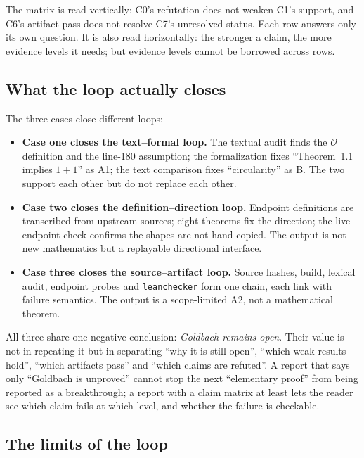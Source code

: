 \documentclass[11pt,a4paper]{article}
\theoremstyle{plain}
\theoremstyle{definition}
\begin{document}
The matrix is read vertically: C0's refutation does not weaken C1's support, and C6's artifact pass does not resolve C7's unresolved status. Each row answers only its own question. It is also read horizontally: the stronger a claim, the more evidence levels it needs; but evidence levels cannot be borrowed across rows.

\subsection{What the loop actually closes}
\label{sec:what-closed}

The three cases close different loops:

\begin{itemize}
\item \textbf{Case one closes the text--formal loop.} The textual audit finds the $\mathcal O$ definition and the line-180 assumption; the formalization fixes ``Theorem~1.1 implies $1+1$'' as A1; the text comparison fixes ``circularity'' as B. The two support each other but do not replace each other.
\item \textbf{Case two closes the definition--direction loop.} Endpoint definitions are transcribed from upstream sources; eight theorems fix the direction; the live-endpoint check confirms the shapes are not hand-copied. The output is not new mathematics but a replayable directional interface.
\item \textbf{Case three closes the source--artifact loop.} Source hashes, build, lexical audit, endpoint probes and \texttt{leanchecker} form one chain, each link with failure semantics. The output is a scope-limited A2, not a mathematical theorem.
\end{itemize}

All three share one negative conclusion: \emph{Goldbach remains open}. Their value is not in repeating it but in separating ``why it is still open'', ``which weak results hold'', ``which artifacts pass'' and ``which claims are refuted''. A report that says only ``Goldbach is unproved'' cannot stop the next ``elementary proof'' from being reported as a breakthrough; a report with a claim matrix at least lets the reader see which claim fails at which level, and whether the failure is checkable.

\subsection{The limits of the loop}
\label{sec:limits-closed}
\end{document}
